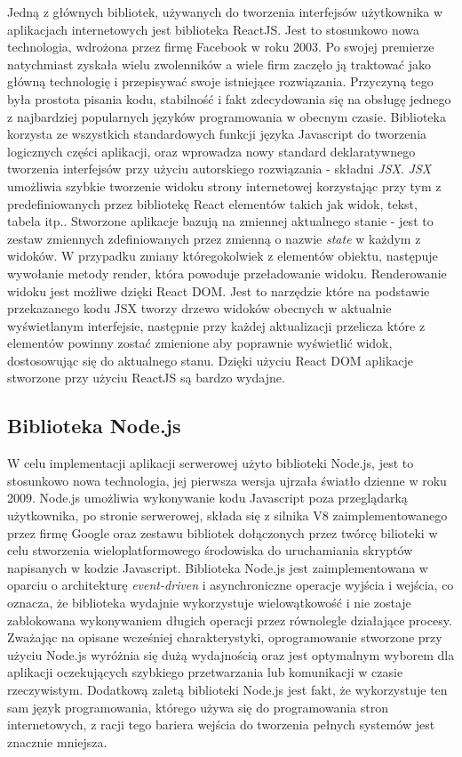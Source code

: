 Jedną z głównych bibliotek, używanych do tworzenia interfejsów użytkownika w aplikacjach internetowych jest biblioteka ReactJS. Jest to stosunkowo nowa technologia, wdrożona przez firmę Facebook w roku 2003. Po swojej premierze natychmiast zyskała wielu zwolenników a wiele firm zaczęło ją traktować jako główną technologię i przepisywać swoje istniejące rozwiązania. Przyczyną tego była prostota pisania kodu, stabilność i fakt zdecydowania się na obsługę jednego z najbardziej popularnych języków programowania w obecnym czasie. Biblioteka korzysta ze wszystkich standardowych funkcji języka Javascript do tworzenia logicznych części aplikacji, oraz wprowadza nowy standard deklaratywnego tworzenia interfejsów przy użyciu autorskiego rozwiązania - składni \textit{JSX}. \textit{JSX} umożliwia szybkie tworzenie widoku strony internetowej korzystając przy tym z predefiniowanych przez bibliotekę React elementów takich jak widok, tekst, tabela itp.. Stworzone aplikacje bazują na zmiennej aktualnego stanie - jest to zestaw zmiennych zdefiniowanych przez zmienną o nazwie \textit{state} w każdym z widoków. W przypadku zmiany któregokolwiek z elementów obiektu, następuje wywołanie metody render, która powoduje przeładowanie widoku. Renderowanie widoku jest możliwe dzięki React DOM. Jest to narzędzie które na podstawie przekazanego kodu JSX tworzy drzewo widoków obecnych w aktualnie wyświetlanym interfejsie, następnie przy każdej aktualizacji przelicza które z elementów powinny zostać zmienione aby poprawnie wyświetlić widok, dostosowując się do aktualnego stanu. Dzięki użyciu React DOM aplikacje stworzone przy użyciu ReactJS są bardzo wydajne.

\subsection{Biblioteka Node.js}

W celu implementacji aplikacji serwerowej użyto biblioteki Node.js, jest to stosunkowo nowa technologia, jej pierwsza wersja ujrzała światło dzienne w roku 2009. Node.js umożliwia wykonywanie kodu Javascript poza przeglądarką użytkownika, po stronie serwerowej, składa się z silnika V8 zaimplementowanego przez firmę Google oraz zestawu bibliotek dołączonych przez twórcę bilioteki w celu stworzenia wieloplatformowego środowiska do uruchamiania skryptów napisanych w kodzie Javascript. Biblioteka Node.js jest zaimplementowana w oparciu o architekturę \textit{event-driven} i asynchroniczne operacje wyjścia i wejścia, co oznacza, że biblioteka wydajnie wykorzystuje wielowątkowość i nie zostaje zablokowana wykonywaniem długich operacji przez równolegle działające procesy. Zważając na opisane wcześniej charakterystyki, oprogramowanie stworzone przy użyciu Node.js wyróżnia się dużą wydajnością oraz jest optymalnym wyborem dla aplikacji oczekujących szybkiego przetwarzania lub komunikacji w czasie rzeczywistym. Dodatkową zaletą biblioteki Node.js jest fakt, że wykorzystuje ten sam język programowania, którego używa się do programowania stron internetowych, z racji tego bariera wejścia do tworzenia pełnych systemów jest znacznie mniejsza.

